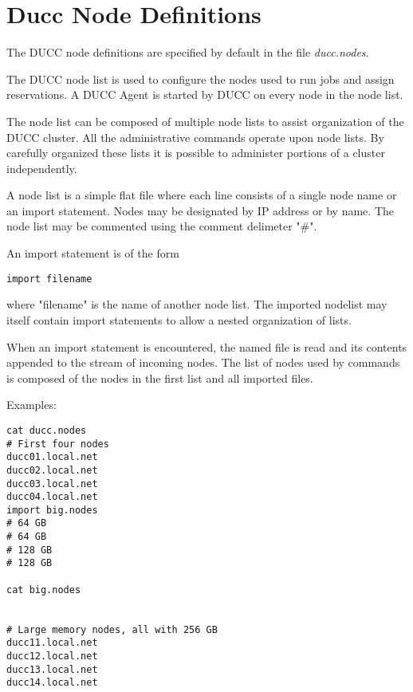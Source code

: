 \section{Ducc Node Definitions}

    The DUCC node definitions are specified by default in the file {\em ducc.nodes}.

    The DUCC node list is used to configure the nodes used to run jobs and assign reservations. A 
    DUCC Agent is started by DUCC on every node in the node list. 

    The node list can be composed of multiple node lists to assist organization of the DUCC cluster. 
    All the administrative commands operate upon node lists. By carefully organized these lists it is 
    possible to administer portions of a cluster independently. 
    
    A node list is a simple flat file where each line consists of a single node name or an import 
    statement. Nodes may be designated by IP address or by name. The node list may be commented 
    using the comment delimeter "\#". 
    
    An import statement is of the form 

\begin{verbatim}
import filename 
\end{verbatim}
    
    where "filename" is the name of another node list. The imported nodelist may itself contain import 
    statements to allow a nested organization of lists. 

    When an import statement is encountered, the named file is read and its contents appended to the 
    stream of incoming nodes. The list of nodes used by commands is composed of the nodes in the 
    first list and all imported files. 

    Examples: 

\begin{verbatim}
cat ducc.nodes 
# First four nodes 
ducc01.local.net 
ducc02.local.net 
ducc03.local.net 
ducc04.local.net 
import big.nodes 
# 64 GB 
# 64 GB 
# 128 GB 
# 128 GB 

cat big.nodes 


# Large memory nodes, all with 256 GB 
ducc11.local.net 
ducc12.local.net 
ducc13.local.net 
ducc14.local.net 
\end{verbatim}
    

